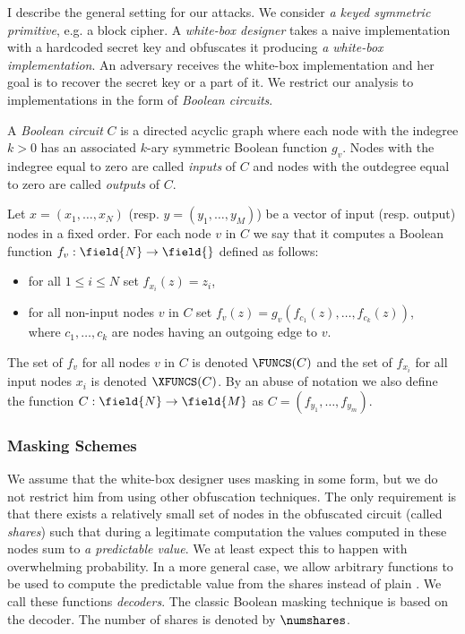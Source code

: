 
I describe the general setting for our attacks. We consider \emph{a keyed symmetric primitive}, e.g. a block cipher. A \emph{white-box designer} takes a naive implementation with a hardcoded secret key and obfuscates it producing \emph{a white-box implementation}. An adversary receives the white-box implementation and her goal is to recover the secret key or a part of it. We restrict our analysis to implementations in the form of \emph{Boolean circuits}. 

\begin{definition}
    A \emph{Boolean circuit} $C$ is a directed acyclic graph where each node with the indegree $k > 0$ has an associated $k$-ary symmetric Boolean function $g_v$. Nodes with the indegree equal to zero are called \emph{inputs} of $C$ and nodes with the outdegree equal to zero are called \emph{outputs} of $C$. 
    
    Let $x = (x_1, \ldots, x_N)$ (resp. $y = (y_1, \ldots, y_M)$) be a vector of input (resp. output) nodes in a fixed order. For each node $v$ in $C$ we say that it computes a Boolean function $f_v: \field{N} \to \field{}$ defined as follows:
    \begin{itemize}
        \item for all $1 \le i \le N$ set $f_{x_i}(z) = z_i$,
        \item for all non-input nodes $v$ in $C$ set $f_{v}(z) = g_v(f_{c_1}(z), \ldots, f_{c_k}(z))$,\\
        where $c_1, \ldots, c_k$ are nodes having an outgoing edge to $v$.
    \end{itemize}
    
    The set of $f_v$ for all nodes $v$ in $C$ is denoted $\FUNCS(C)$ and the set of $f_{x_i}$ for all input nodes $x_i$ is denoted $\XFUNCS(C)$. By an abuse of notation we also define the function $C: \field{N} \to \field{M}$ as $C = (f_{y_1}, \ldots, f_{y_m})$.
\end{definition}

\subsubsection{Masking Schemes}
We assume that the white-box designer uses masking in some form, but we do not restrict him from using other obfuscation techniques. The only requirement is that there exists a relatively small set of nodes in the obfuscated circuit (called \emph{shares}) such that during a legitimate computation the values computed in these nodes sum to \emph{a predictable value}. We at least expect this to happen with overwhelming probability. In a more general case, we allow arbitrary functions to be used to compute the predictable value from the shares instead of plain \txor{}. We call these functions \emph{decoders}. The classic Boolean masking technique is based on the \txor{} decoder. The number of shares is denoted by $\numshares$.

